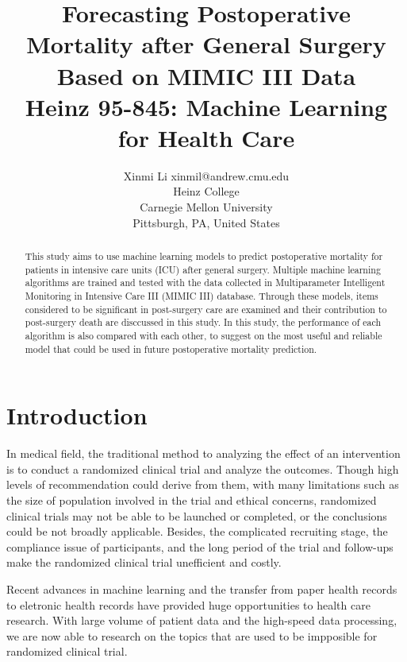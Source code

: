 \documentclass[twoside,11pt]{article}
\begin{document}
\title{Forecasting Postoperative Mortality after General Surgery Based on MIMIC III Data\\ Heinz 95-845: Machine Learning for Health Care}

\author{\name Xinmi Li \email xinmil@andrew.cmu.edu \\
       \addr Heinz College\\
       Carnegie Mellon University\\
       Pittsburgh, PA, United States
       } 

\maketitle

\begin{abstract}
  This study aims to use machine learning models to predict postoperative mortality for patients in intensive care units (ICU) after general surgery. Multiple machine learning algorithms are trained and tested with the data collected in Multiparameter Intelligent Monitoring in Intensive Care III (MIMIC III) database. Through these models, items considered to be significant in post-surgery care are examined and their contribution to post-surgery death are disccussed in this study. In this study, the performance of each algorithm is also compared with each other, to suggest on the most useful and reliable model that could be used in future postoperative mortality prediction.
\end{abstract}

\section{Introduction}
In medical field, the traditional method to analyzing the effect of an intervention is to conduct a randomized clinical trial and analyze the outcomes. Though high levels of recommendation could derive from them, with many limitations such as the size of population involved in the trial and ethical concerns, randomized clinical trials may not be able to be launched or completed, or the conclusions could be not broadly applicable. Besides, the complicated recruiting stage, the compliance issue of participants, and the long period of the trial and follow-ups make the randomized clinical trial unefficient and costly.

Recent advances in machine learning and the transfer from paper health records to eletronic health records have provided huge opportunities to health care research. With large volume of patient data and the high-speed data processing, we are now able to research on the topics that are used to be impposible for randomized clinical trial. 
\end{document}
